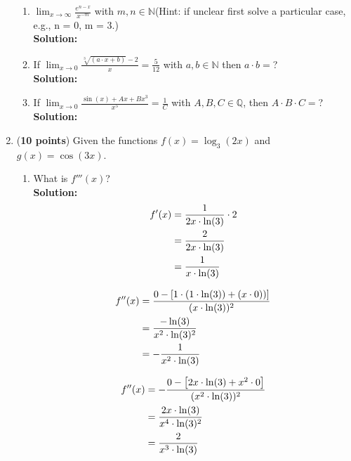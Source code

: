 \documentclass[a4paper]{article}
\begin{document}
\begin{enumerate}
\begin{enumerate}
	\item $\lim_{x \to \infty} \frac{e^{n-x}}{x^{-m}}$ with $m,n \in \mathbb{N}$(Hint: if unclear first solve a particular case, e.g., n = 0, m = 3.)\\
	\textbf{Solution:}\\
	


	\item If $\lim_{x \to 0} \frac{\sqrt[3]{(a \cdot x + b)}-2}{x} = \frac{5}{12}$ with $a,b \in \mathbb{N}$ then $a \cdot b = $?\\
	\textbf{Solution:}\\
	
	
	
	
	\item If $\lim_{x \to 0} \frac{\sin(x) + Ax + Bx^3}{x^5} = \frac{1}{C}$ with $A,B,C \in \mathbb{Q}$, then $A \cdot B \cdot C = $?\\
	\textbf{Solution:}\\
	
	
	
\end{enumerate}

\newpage

\item (\textbf{10 points}) Given the functions $f(x) = \log_3(2x)$ and $g(x) = \cos(3x)$.


\begin{enumerate}
	\item What is $f'''(x)$?\\
	\textbf{Solution:}\\
	


\begin{align*}
	f'(x) &= \frac{1}{2x \cdot \ln(3)} \cdot 2\notag\\
	&= \frac{2}{2x \cdot \ln(3)}\notag\\
	&= \frac{1}{x \cdot \ln(3)}\notag
\end{align*} 


\begin{align*}
	f''(x) &= \frac{0 - \left[ 1 \cdot (1 \cdot \ln(3)) + (x \cdot 0))\right]}{(x \cdot \ln(3))^2}\notag\\
	&= \frac{-\ln(3)}{x^2 \cdot \ln(3)^2}\notag\\
	&= - \frac{1}{x^2 \cdot \ln(3)}\notag
\end{align*} 
	
\begin{align*}
	f''(x) &= - \frac{0 - \left[ 2x \cdot \ln(3) + x^2 \cdot 0\right]}{(x^2 \cdot \ln(3))^2}\notag\\
	&= \frac{2x \cdot \ln(3)}{x^4 \cdot \ln(3)^2}\notag\\
	&= \frac{2}{x^3 \cdot \ln(3)}\notag
\end{align*}


\end{enumerate}
\end{enumerate}
\end{document}
